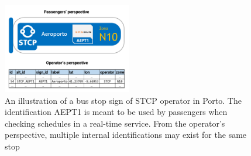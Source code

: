 \documentclass[]{interact}
\theoremstyle{plain}%
\theoremstyle{definition}
\theoremstyle{remark}
\theoremstyle{definition}
\begin{document}
\begin{figure}[htbp]
\centering
\includegraphics[width=0.5\textwidth]{images/stop.pdf}
\caption{An illustration of a bus stop sign of STCP operator in Porto. The identification AEPT1 is meant to be used by passengers when checking schedules in a real-time service. From the operator's perspective, multiple internal identifications may exist for the same stop}
\label{fig:stcp_stop}
\end{figure}

%



%
%
%
%


\end{document}
